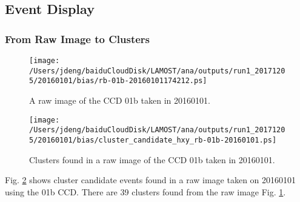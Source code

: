 \documentclass[12pt,twoside,letterpaper]{article}
\begin{document}
\subsection{Event Display} 
\subsubsection{From Raw Image to Clusters} 

   \begin{figure}[!htbp]
   \begin{center}
       \texttt{[image: /Users/jdeng/baiduCloudDisk/LAMOST/ana/outputs/run1\_20171205/20160101/bias/rb-01b-20160101174212.ps]}
       \caption{A raw image of the CCD 01b taken in 20160101.}
       \label{Fig:rawImage_01b}
   \end{center}    
   \end{figure}


   \begin{figure}[!htbp]
   \begin{center}
       \texttt{[image: /Users/jdeng/baiduCloudDisk/LAMOST/ana/outputs/run1\_20171205/20160101/bias/cluster\_candidate\_hxy\_rb-01b-20160101.ps]}
       \caption{Clusters found in a raw image of the CCD 01b taken in 20160101.}
       \label{Fig:clusters_01b}
   \end{center}    
   \end{figure}

Fig. \ref{Fig:clusters_01b} shows cluster candidate events found in a raw image taken on 20160101 using the 01b CCD. There are 39 clusters found from the raw image Fig. \ref{Fig:rawImage_01b}.
\end{document}
